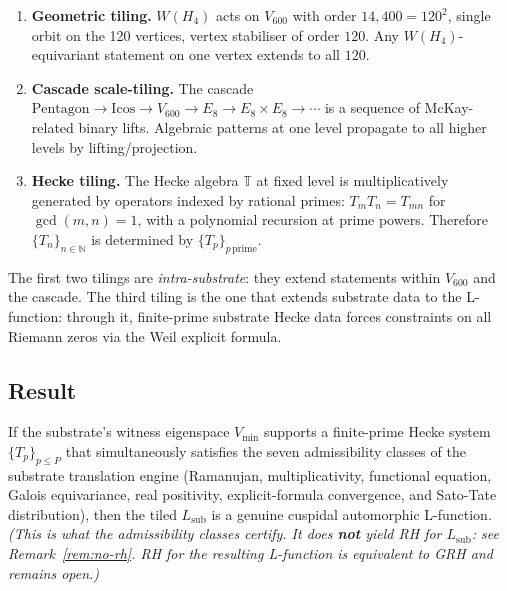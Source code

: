 \documentclass[11pt,a4paper]{article}
\theoremstyle{definition}
\newcommand{\N}{\mathbb{N}}
\newcommand{\sub}{\mathrm{sub}}
\newcommand{\Hecke}{\mathbb{T}}
\newcommand{\Vmin}{V_{\min}}
\begin{document}
\begin{enumerate}[label=(T\arabic*)]
\item \textbf{Geometric tiling.} $W(H_4)$ acts on $V_{600}$ with order
      $14{,}400=120^2$, single orbit on the 120 vertices, vertex stabiliser of
      order $120$. Any $W(H_4)$-equivariant statement on one vertex extends to
      all $120$.

\item \textbf{Cascade scale-tiling.} The cascade
      $\mathrm{Pentagon}\to\mathrm{Icos}\to V_{600}\to E_8\to E_8\!\times\!E_8\to\cdots$
      is a sequence of McKay-related binary lifts. Algebraic patterns at one
      level propagate to all higher levels by lifting/projection.

\item \textbf{Hecke tiling.} The Hecke algebra $\Hecke$ at fixed level is
      multiplicatively generated by operators indexed by rational primes:
      $T_m T_n = T_{mn}$ for $\gcd(m,n)=1$, with a polynomial recursion at
      prime powers. Therefore $\{T_n\}_{n\in\N}$ is determined by
      $\{T_p\}_{p\,\mathrm{prime}}$.
\end{enumerate}

The first two tilings are \emph{intra-substrate}: they extend statements within
$V_{600}$ and the cascade. The third tiling is the one that extends substrate
data to the L-function: through it, finite-prime substrate Hecke data forces
constraints on all Riemann zeros via the Weil explicit formula.

\subsection{Result}
\begin{tcolorbox}[colback=blue!2,colframe=blue!50!black,arc=2mm,
    title={\textbf{Fractal Tiling Theorem (informal)}},fonttitle=\bfseries]
If the substrate's witness eigenspace $\Vmin$ supports a finite-prime Hecke
system $\{T_p\}_{p\le P}$ that simultaneously satisfies the seven admissibility
classes of the substrate translation engine (Ramanujan, multiplicativity,
functional equation, Galois equivariance, real positivity, explicit-formula
convergence, and Sato-Tate distribution), then the tiled $L_\sub$ is a genuine
cuspidal automorphic L-function. \emph{(This is what the admissibility classes
certify. It does \textbf{not} yield RH for $L_\sub$: see
Remark~\ref{rem:no-rh}. RH for the resulting L-function is equivalent to GRH
and remains open.)}
\end{tcolorbox}
\end{document}
